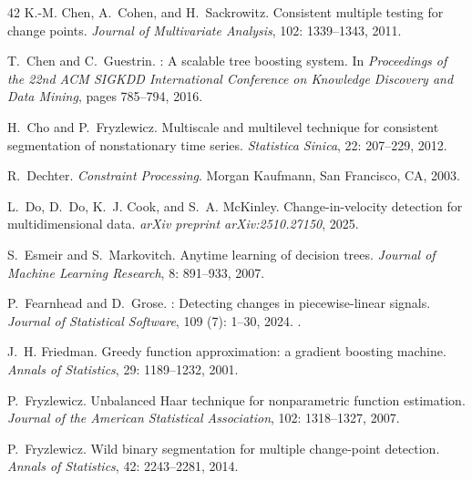 \documentclass[12pt, a4paper]{article}
\begin{document}
\begin{thebibliography}{42}
K.-M. Chen, A.~Cohen, and H.~Sackrowitz.
\newblock Consistent multiple testing for change points.
\newblock \emph{Journal of Multivariate Analysis}, 102: 1339--1343,
  2011.

T.~Chen and C.~Guestrin.
: A scalable tree boosting system.
\newblock In \emph{Proceedings of the 22nd ACM SIGKDD International Conference
  on Knowledge Discovery and Data Mining}, pages 785--794, 2016.

H.~Cho and P.~Fryzlewicz.
\newblock Multiscale and multilevel technique for consistent segmentation of
  nonstationary time series.
\newblock \emph{Statistica Sinica}, 22: 207--229, 2012.

R.~Dechter.
\newblock \emph{Constraint Processing}.
\newblock Morgan Kaufmann, San Francisco, CA, 2003.

L.~Do, D.~Do, K.~J. Cook, and S.~A. McKinley.
\newblock Change-in-velocity detection for multidimensional data.
\newblock \emph{arXiv preprint arXiv:2510.27150}, 2025.

S.~Esmeir and S.~Markovitch.
\newblock Anytime learning of decision trees.
\newblock \emph{Journal of Machine Learning Research}, 8: 891--933,
  2007.

P.~Fearnhead and D.~Grose.
: Detecting changes in piecewise-linear signals.
\newblock \emph{Journal of Statistical Software}, 109 (7):
  1--30, 2024.
\newblock {}.

J.~H. Friedman.
\newblock Greedy function approximation: a gradient boosting machine.
\newblock \emph{Annals of Statistics}, 29: 1189--1232, 2001.

P.~Fryzlewicz.
\newblock Unbalanced {H}aar technique for nonparametric function estimation.
\newblock \emph{Journal of the American Statistical Association}, 102:
  1318--1327, 2007.

P.~Fryzlewicz.
\newblock Wild binary segmentation for multiple change-point detection.
\newblock \emph{Annals of Statistics}, 42: 2243--2281, 2014.


\end{thebibliography}
\end{document}
